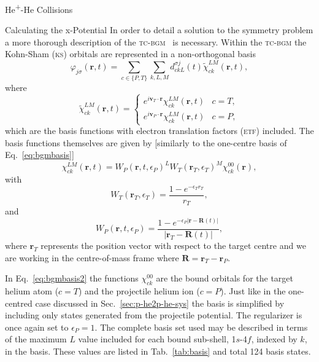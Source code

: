 \documentclass[letterpaper, 11 pt]{report}
\begin{document}
\begin{chapter}{\texorpdfstring{He\textsuperscript{+}}{He+}-He Collisions \label{chap:hephe}}
\begin{section}{Calculating the x-Potential \label{sec:pot}}
      In order to detail a solution to the symmetry problem a more thorough description of the
      \textsc{tc-bgm}~\cite{tcbgm} is necessary. Within the \textsc{tc-bgm} the Kohn-Sham (\textsc{ks})
      orbitals are represented in a non-orthogonal basis
      \begin{equation} \label{eq:bgmexp}
         \varphi_{j \sigma}(\mathbf{r},t) = \sum\limits_{c \in \{P, T\}} \sum\limits_{k, L, M}
                               d_{c k L}^{\sigma j}(t) \tilde{\chi}^{LM}_{c k}(\mathbf{r},t),
      \end{equation}
      where
      \begin{equation} \label{eq:etfbasis}
         \tilde{\chi}^{L M}_{ck}(\mathbf{r},t) =
            \begin{cases}
               e^{i \mathbf{v}_T \cdot \mathbf{r}} {\chi}^{L M}_{c k}(\mathbf{r},t) & c = T, \\[2ex]
               e^{i \mathbf{v}_P \cdot \mathbf{r}} {\chi}^{L M}_{c k}(\mathbf{r},t) & c = P,
            \end{cases}
      \end{equation}
      which are the basis functions with electron translation factors (\textsc{etf}) included. The basis
      functions themselves are given by [similarly to the one-centre basis of Eq.~\eqref{eq:bgmbasis}]
      \begin{equation} \label{eq:bgmbasis2}
         \chi^{LM}_{ck} (\mathbf{r},t)
         = W_P( \mathbf{r},t, \epsilon_P)^L W_T(\mathbf{r}_T,\epsilon_T)^M \chi^{00}_{ck}(\mathbf{r}),
      \end{equation}
      with
      \begin{equation}
         W_T(\mathbf{r}_T,\epsilon_T) = \frac{1 - e^{-\epsilon_T r_T}}{r_T},
      \end{equation}
      and
      \begin{equation}
         W_P (\mathbf{r},t,\epsilon_P)
         = \frac{1 - e^{-\epsilon_P|\mathbf{r} - \mathbf{R}(t)|}}{|\mathbf{r}_T - \mathbf{R}(t)|},
      \end{equation}
      where $\mathbf{r}_T$ represents the position vector with respect to the target centre and we are
      working in the centre-of-mass frame where $\mathbf{R} = \mathbf{r}_T - \mathbf{r}_P$.

      In Eq.~\eqref{eq:bgmbasis2} the functions $\chi^{00}_{ck}$ are the bound orbitals for the target
      helium atom ($c = T$) and the projectile helium ion ($c = P$). Just like in the one-centred case
      discussed in Sec.~\ref{sec:p-he2p-he-sys} the basis is simplified by including only states
      generated from the projectile potential. The regularizer is once again set to $\epsilon_P = 1$.
      The complete basis set used may be described in terms of the maximum $L$ value included for each
      bound sub-shell, 1$s$-4$f$, indexed by $k$, in the basis. These values are listed in
      Tab.~\ref{tab:basis} and total 124 basis states.


\end{section}
\end{chapter}
\end{document}
